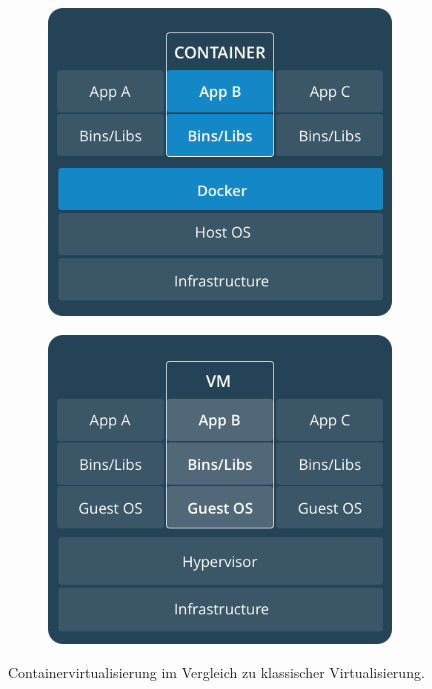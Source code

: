 \documentclass[12pt,a4paper]{scrartcl}
\begin{document}
\begin{figure}[h!]
\centering
	\begin{subfigure}{0.4\linewidth}
		\includegraphics[scale=0.2]{DockerContainer.png} 
	\end{subfigure}
	\hspace*{1 cm}
	\begin{subfigure}{0.4\linewidth}
    	\includegraphics[scale=0.2]{DockerVM.png}
	\end{subfigure}
	\caption[https://docs.docker.com/get-started/]{Containervirtualisierung im Vergleich zu klassischer Virtualisierung.}
\end{figure}
\end{document}
